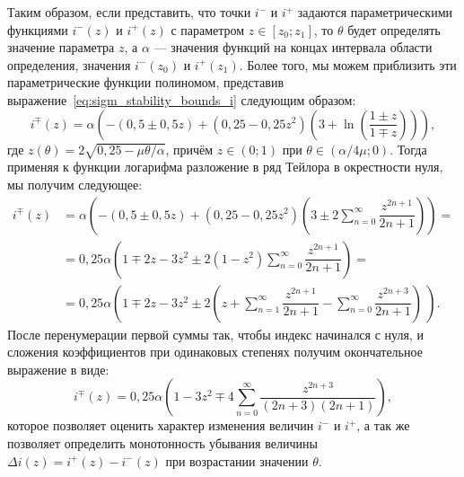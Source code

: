 
Таким образом, если представить, что точки $i^{-}$ и $i^{+}$ задаются параметрическими функциями $i^{-}(z)$ и $i^{+}(z)$ с параметром $z \in \left[z_{0}; z_{1}\right]$, то $\theta$ будет определять значение параметра $z$, а $\alpha$ --- значения функций на концах интервала области определения, \ie значения $i^{-}(z_{0})$ и $i^{+}(z_{1})$. Более того, мы можем приблизить эти параметрические функции полиномом, представив выражение~\eqref{eq:sigm_stability_bounds_i} следующим образом:
\begin{equation}
    \nonumber
    i^{\mp}(z) = \alpha \left(-(0,5 \pm 0,5z) + \left(0,25 - 0,25z^2\right) \left(3 + \ln\left(\dfrac{1 \pm z}{1 \mp z}\right)\right)\right),
\end{equation}
где $z(\theta) = 2 \sqrt{0,25 - \mu\theta/\alpha}$, причём $z \in \left(0;1\right)$ при $\theta \in \left(\alpha/4\mu;0\right)$. Тогда применяя к функции логарифма разложение в ряд Тейлора в окрестности нуля, мы получим следующее:
\begin{align*}
    i^{\mp}(z) &= \alpha \left( -(0,5 \pm 0,5z) + \left(0,25 - 0,25z^2\right) \left(3 \pm 2\sum_{n=0}^{\infty}\dfrac{z^{2n+1}}{2n+1}\right) \right) = \\
               &= 0,25 \alpha \left( 1 \mp 2z - 3z^2 \pm 2 \left(1 - z^2\right) \sum_{n=0}^{\infty}\dfrac{z^{2n+1}}{2n+1} \right) = \\
               &= 0,25 \alpha \left( 1 \mp 2z - 3z^2 \pm 2\left(z + \sum_{n=1}^{\infty}\dfrac{z^{2n+1}}{2n+1} - \sum_{n=0}^{\infty}\dfrac{z^{2n+3}}{2n+1}\right)\ \right).
\end{align*}
После перенумерации первой суммы так, чтобы индекс начинался с нуля, и сложения коэффициентов при одинаковых степенях получим окончательное выражение в виде:
\begin{equation}
    i^{\mp}(z) = 0,25 \alpha \left( 1 - 3z^2 \mp 4 \sum_{n=0}^{\infty}\dfrac{z^{2n+3}}{(2n+3)(2n+1)} \right),
\end{equation}
которое позволяет оценить характер изменения величин $i^{-}$ и $i^{+}$, а так же позволяет определить монотонность убывания величины $\Delta i(z) = i^{+}(z) - i^{-}(z)$ при возрастании значении $\theta$.

